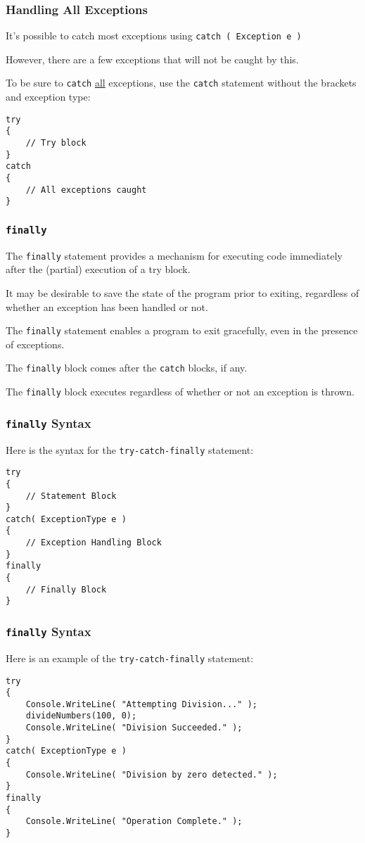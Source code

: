 \begin{frame}[fragile]
\frametitle{Handling All Exceptions}

It's possible to catch most exceptions using \texttt{catch ( Exception e )}

However, there are a few exceptions that will not be caught by this.

To be sure to \texttt{catch} \underline{all} exceptions, use the \texttt{catch} statement without the brackets and exception type:

\begin{verbatim}
try
{
    // Try block
}
catch
{
    // All exceptions caught
}
\end{verbatim}

\end{frame}

\begin{frame}
\frametitle{\texttt{finally}}

The \texttt{finally} statement provides a mechanism for executing code immediately after the (partial) execution of a try block.

It may be desirable to save the state of the program prior to exiting, regardless of whether an exception has been handled or not.

The \texttt{finally} statement enables a program to exit gracefully, even in the presence of exceptions.

The \texttt{finally} block comes after the \texttt{catch} blocks, if any.

The \texttt{finally} block executes regardless of whether or not an exception is thrown.

\end{frame}


\begin{frame}[fragile]
\frametitle{\texttt{finally} Syntax}

Here is the syntax for the \texttt{try-catch-finally} statement:

\begin{verbatim}
try
{
    // Statement Block
}
catch( ExceptionType e )
{
    // Exception Handling Block
}
finally
{
    // Finally Block
}
\end{verbatim}

\end{frame}

\begin{frame}[fragile]
\frametitle{\texttt{finally} Syntax}

Here is an example of the \texttt{try-catch-finally} statement:

\begin{verbatim}
try
{
    Console.WriteLine( "Attempting Division..." );
    divideNumbers(100, 0);
    Console.WriteLine( "Division Succeeded." );
}
catch( ExceptionType e )
{
    Console.WriteLine( "Division by zero detected." );
}
finally
{
    Console.WriteLine( "Operation Complete." );
}
\end{verbatim}

\end{frame}

